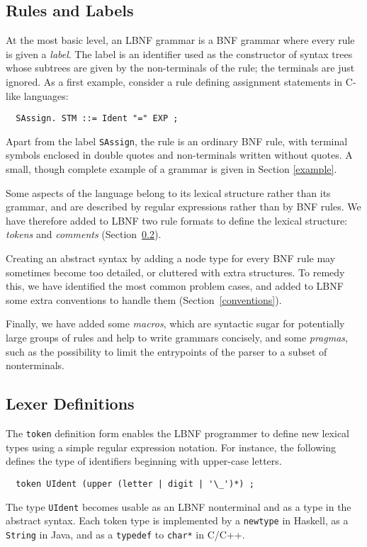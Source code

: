 \subsection{Rules and Labels}

At the most basic level, an LBNF grammar is a BNF grammar where 
every rule is given a {\em label}. The label is an identifier 
used as the constructor of syntax trees whose subtrees are 
given by the non-terminals of the rule; the terminals are just ignored.
As a first example, 
consider a rule defining assignment statements in C-like languages:
\begin{verbatim}
  SAssign. STM ::= Ident "=" EXP ;
\end{verbatim}
Apart from the label {\tt SAssign},
the rule is an ordinary BNF rule, with terminal symbols enclosed in
double quotes and non-terminals written without quotes. A small, though 
complete example of a grammar is given in Section \ref{example}.

Some aspects of the language belong to its lexical
structure rather than its grammar, and are described by
regular expressions rather than by BNF rules. We have therefore
added to LBNF two rule formats to define the lexical structure: 
{\em tokens} and {\em comments} (Section~\ref{lexer}).

Creating an abstract syntax by adding a node type for every BNF rule
may sometimes become too detailed, 
or cluttered with extra structures. 
To remedy this, we have identified the most common problem cases, 
and added to LBNF
some extra conventions to handle them (Section~\ref{conventions}).

Finally, we have added some {\em macros}, 
which are syntactic sugar for potentially 
large groups of rules and help to write grammars 
concisely, and some {\em pragmas}, such as the possibility
to limit the entrypoints of the parser to a subset of nonterminals.

\subsection{Lexer Definitions}
\label{lexer}


\label{reg}

The {\tt token} definition form enables the LBNF programmer
to define new lexical types using
a simple regular expression notation.
For instance, the following defines the type of
identifiers beginning with upper-case letters.
\begin{verbatim}
  token UIdent (upper (letter | digit | '\_')*) ;
\end{verbatim}
The type {\tt UIdent} becomes usable
as an LBNF nonterminal and as a type in the abstract syntax.
Each token type is implemented by a {\tt newtype} in Haskell, as
a {\tt String} in Java, and as a {\tt typedef} to {\tt char*} in C/C++.


